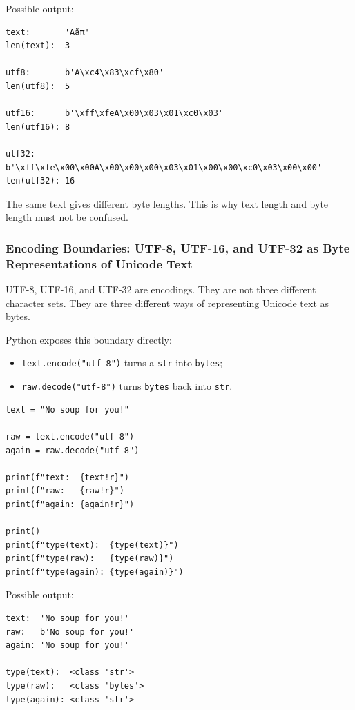 Possible output:

\begin{verbatim}
text:       'Aăπ'
len(text):  3

utf8:       b'A\xc4\x83\xcf\x80'
len(utf8):  5

utf16:      b'\xff\xfeA\x00\x03\x01\xc0\x03'
len(utf16): 8

utf32:      b'\xff\xfe\x00\x00A\x00\x00\x00\x03\x01\x00\x00\xc0\x03\x00\x00'
len(utf32): 16
\end{verbatim}

The same text gives different byte lengths. This is why text length and byte length must not be confused.

\subsubsection{Encoding Boundaries: UTF-8, UTF-16, and UTF-32 as Byte Representations of Unicode Text}

UTF-8, UTF-16, and UTF-32 are encodings. They are not three different character sets. They are three different ways of representing Unicode text as bytes.

Python exposes this boundary directly:

\begin{itemize}
    \item \texttt{text.encode("utf-8")} turns a \texttt{str} into \texttt{bytes};
    \item \texttt{raw.decode("utf-8")} turns \texttt{bytes} back into \texttt{str}.
\end{itemize}

\begin{verbatim}
text = "No soup for you!"

raw = text.encode("utf-8")
again = raw.decode("utf-8")

print(f"text:  {text!r}")
print(f"raw:   {raw!r}")
print(f"again: {again!r}")

print()
print(f"type(text):  {type(text)}")
print(f"type(raw):   {type(raw)}")
print(f"type(again): {type(again)}")
\end{verbatim}

Possible output:

\begin{verbatim}
text:  'No soup for you!'
raw:   b'No soup for you!'
again: 'No soup for you!'

type(text):  <class 'str'>
type(raw):   <class 'bytes'>
type(again): <class 'str'>
\end{verbatim}

